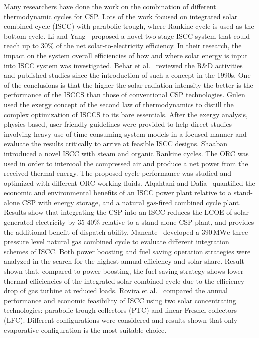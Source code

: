 Many researchers have done the work on the combination of different thermodynamic cycles for CSP. Lots of the work focused on integrated solar combined cycle (ISCC) with parabolic trough, where Rankine cycle is used as the bottom cycle. 
Li and Yang~\cite{Li2014} proposed a novel two-stage ISCC system that could reach up to 30\% of the net solar-to-electricity efficiency. In their research, the impact on the system overall efficiencies of how and where solar energy is input into ISCC system was investigated.
Behar et al.~\cite{Behar2014} reviewed the R\&D activities and published studies since the introduction of such a concept in the 1990s. One of the conclusions is that the higher the solar radiation intensity the better is the performance of the ISCCS than those of conventional CSP technologies.
Gulen ~\cite{Gulen2015} used the exergy concept of the second law of thermodynamics to distill the complex optimization of ISCCS to its bare essentials. After the exergy analysis, physics-based, user-friendly guidelines were provided to help direct studies involving heavy use of time consuming system models in a focused manner and evaluate the results critically to arrive at feasible ISCC designs.
Shaaban ~\cite{Shaaban2016} introduced a novel ISCC with steam and organic Rankine cycles. The ORC was used in order to intercool the compressed air and produce a net power from the received thermal energy. The proposed cycle performance was studied and optimized with different ORC working fluids.
Alqahtani and Dalia~\cite{Alqahtani2016} quantified the economic and environmental benefits of an ISCC power plant relative to a stand-alone CSP with energy storage, and a natural gas-fired combined cycle plant. Results show that integrating the CSP into an ISCC reduces the LCOE of solar-generated electricity by 35-40\% relative to a stand-alone CSP plant, and provides the additional benefit of dispatch ability.
Manente~\cite{Manente2016} developed a $390\,\mathrm{MWe}$ three pressure level natural gas combined cycle to evaluate different integration schemes of ISCC. Both power boosting and fuel saving operation strategies were analyzed in the search for the highest annual efficiency and solar share. Result shown that, compared to power boosting, the fuel saving strategy shows lower thermal efficiencies of the integrated solar combined cycle due to the efficiency drop of gas turbine at reduced loads.
Rovira et al.~\cite{Rovira2016} compared the annual performance and economic feasibility of ISCC using two solar concentrating technologies: parabolic trough collectors (PTC) and linear Fresnel collectors (LFC). Different configurations were considered and results shown that only evaporative configuration is the most suitable choice.
